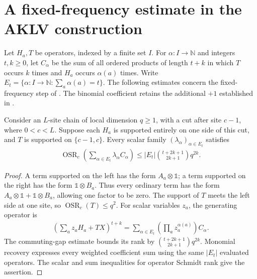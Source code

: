 \section{A fixed-frequency estimate in the AKLV construction}

Let $H_a,T$ be operators, indexed by a finite set $I$. For
$\alpha:I\to\mathbb N$ and integers $t,k\ge0$, let $C_\alpha$ be the sum of
all ordered products of length $t+k$ in which $T$ occurs $k$ times and
$H_a$ occurs $\alpha(a)$ times. Write
$E_t=\{\alpha:I\to\mathbb N:\sum_a\alpha(a)=t\}$.
The following estimates concern the fixed-frequency step of
\cite[Lemma~4.2]{Arad2013AreaLaw}. The binomial coefficient retains the
additional $+1$ established in
\cite{gap:aklv13_interpolation_and_word_count}.

\begin{lemma}
    \label{thm:aklv_supported_frequency_rank}
    \leanok
    Consider an $L$-site chain of local dimension $q\ge1$, with a cut after
    site $c-1$, where $0<c<L$. Suppose each $H_a$ is supported entirely
    on one side of this cut, and $T$ is supported on $\{c-1,c\}$.
    Every scalar family $(\lambda_\alpha)_{\alpha\in E_t}$ satisfies
    \begin{align*}
        \operatorname{OSR}_c\!\left(
        \sum_{\alpha\in E_t}\lambda_\alpha C_\alpha\right)
        \le |E_t|\binom{t+2k+1}{2k+1}q^{2k}.
    \end{align*}
\end{lemma}
\begin{proof}
    \leanok
    A term supported on the left has the form $A_a\otimes\mathbb 1$;
    a term supported on the right has the form $\mathbb 1\otimes B_a$.
    Thus every ordinary term has the form
    $A_a\otimes\mathbb 1+\mathbb 1\otimes B_a$, allowing one factor to be zero.
    The support of $T$ meets the left side at one site, so
    $\operatorname{OSR}_c(T)\le q^2$.
    For scalar variables $z_a$, the generating operator is
    \begin{align*}
        [X^k]\left(\sum_a z_aH_a+TX\right)^{t+k}
        =\sum_{\alpha\in E_t}\left(\prod_a z_a^{\alpha(a)}\right)C_\alpha.
    \end{align*}
    The commuting-gap estimate bounds its rank by
    $\binom{t+2k+1}{2k+1}q^{2k}$. Monomial recovery expresses every weighted
    coefficient sum using the same $|E_t|$ evaluated operators. The scalar
    and sum inequalities for operator Schmidt rank give the assertion.
\end{proof}

